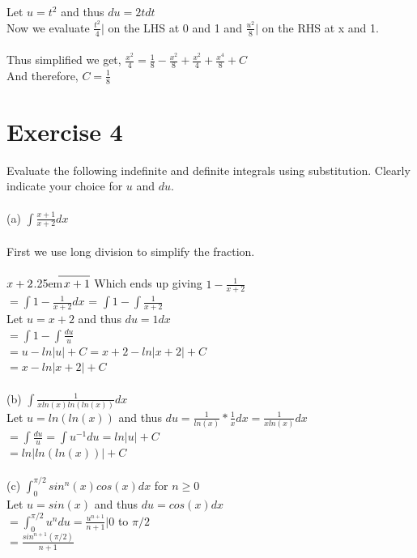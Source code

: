 \documentclass[12pt]{article}
\newcommand\Mydiv[2]{%
$\strut#1$\kern.25em\smash{\raise.3ex\hbox{$\big)$}}$\mkern-8mu
        \overline{\enspace\strut#2}$}
\begin{document}
\noindent Let $u = t^2$ and thus $du = 2tdt$\\
Now we evaluate $\frac{t^2}{4}\bigg|$ on the LHS at 0 and 1 and $\frac{u^2}{8}\bigg|$ on the RHS at x and 1.\\~\\

\noindent Thus simplified we get, $\frac{x^2}{4} = \frac{1}{8}-\frac{x^2}{8} + \frac{x^2}{4}+\frac{x^4}{8}+C$\\
And therefore, $C = \frac{1}{8}$

\section{Exercise 4}
Evaluate the following indefinite and definite integrals using substitution. Clearly indicate your choice for $u$ and $du$. \\~\\
(a) $\int\frac{x+1}{x+2}dx$\\~\\
First we use long division to simplify the fraction. \\~\\
\Mydiv{x+2}{x+1} Which ends up giving $1 - \frac{1}{x+2}$\\
$= \int 1-\frac{1}{x+2}dx$ = $\int 1 - \int \frac{1}{x+2}$\\
Let $u = x+2$ and thus $du = 1dx$\\
$= \int 1 - \int \frac{du}{u}$\\
$= u - ln|u| + C = x + 2 - ln|x+2| + C$\\
$= x - ln|x+2| + C$\\~\\

\noindent(b) $\int \frac{1}{xln(x)ln(ln(x))}dx$\\
Let $u = ln(ln(x))$ and thus $du = \frac{1}{ln(x)} * \frac{1}{x} dx = \frac{1}{xln(x)} dx$\\
$= \int \frac{du}{u} = \int u^{-1} du = ln|u| + C$\\
$= ln|ln(ln(x))|+C$ \\~\\

\noindent(c) $\int_{0}^{\pi/2} sin^n(x)cos(x)dx$ for $n \geq 0$\\
Let $u = sin(x)$ and thus $du = cos(x)dx$\\
$= \int_0^{\pi/2} u^n du = \frac{u^{n+1}}{n+1} \bigg| 0$ to $\pi/2$\\
$= \frac{sin^{n+1}(\pi/2)}{n+1}$
\end{document}

